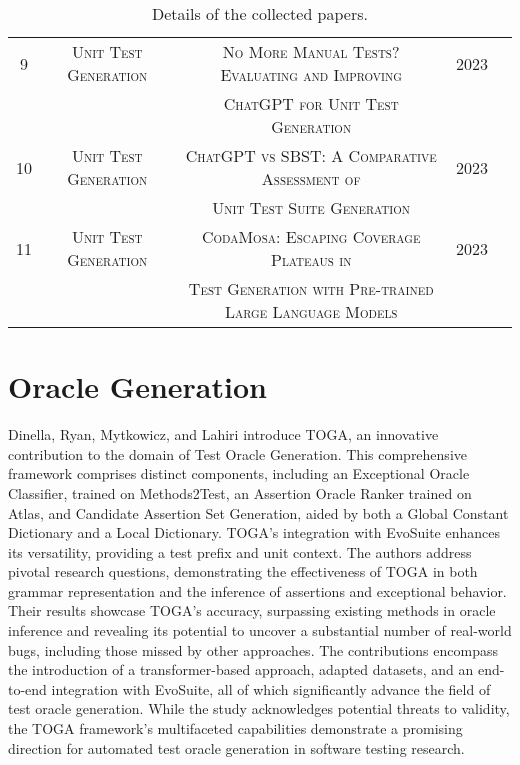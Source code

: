 \begin{table}[H]
\begin{tabular}{c|c|c|c|c}
        9 & \scriptsize\textsc{Unit Test Generation} & \scriptsize\textsc{No More Manual Tests? Evaluating and Improving} & 2023 & \cite{yuan_no_2023}\\
        & & \scriptsize\textsc{ChatGPT for Unit Test Generation} & & \\
        
        10 & \scriptsize\textsc{Unit Test Generation} & \scriptsize\textsc{ChatGPT vs SBST: A Comparative Assessment of} & 2023 & \cite{tang_chatgpt_2023}\\
        & & \scriptsize\textsc{Unit Test Suite Generation} & & \\
        
        11 & \scriptsize\textsc{Unit Test Generation} & \scriptsize\textsc{CodaMosa: Escaping Coverage Plateaus in} & 2023 & \cite{lemieux_codamosa_2023}\\
        & & \scriptsize\textsc{Test Generation with Pre-trained Large Language Models} & & \\
        
    \end{tabular}

\caption{Details of the collected papers.}
\label{tab:collected_papers}
\end{table}

\section{Oracle Generation}
\label{sec:soa_oracle_generation}
\vspace{0.2 cm}

Dinella, Ryan, Mytkowicz, and Lahiri introduce TOGA\cite{gabriel_ryan_toga_2022}, an innovative contribution to the domain of Test Oracle Generation. This comprehensive framework comprises distinct components, including an Exceptional Oracle Classifier, trained on Methods2Test, an Assertion Oracle Ranker trained on Atlas, and Candidate Assertion Set Generation, aided by both a Global Constant Dictionary and a Local Dictionary. TOGA's integration with EvoSuite enhances its versatility, providing a test prefix and unit context. The authors address pivotal research questions, demonstrating the effectiveness of TOGA in both grammar representation and the inference of assertions and exceptional behavior. Their results showcase TOGA's accuracy, surpassing existing methods in oracle inference and revealing its potential to uncover a substantial number of real-world bugs, including those missed by other approaches. The contributions encompass the introduction of a transformer-based approach, adapted datasets, and an end-to-end integration with EvoSuite, all of which significantly advance the field of test oracle generation. While the study acknowledges potential threats to validity, the TOGA framework's multifaceted capabilities demonstrate a promising direction for automated test oracle generation in software testing research.

